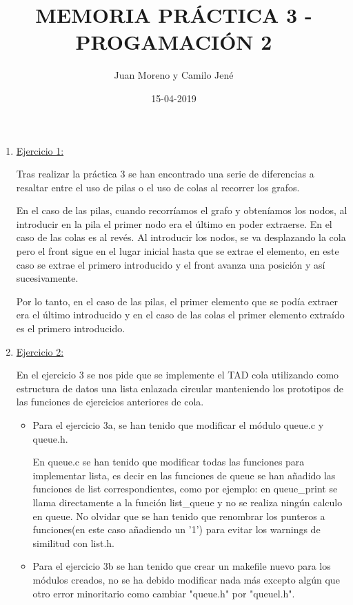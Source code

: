 \documentclass[spanish]{article}
\title{MEMORIA PRÁCTICA 3 - PROGAMACIÓN 2}
\author{Juan Moreno y Camilo Jené}
\date{15-04-2019}
\begin{document}
	\maketitle
	
	\begin{enumerate}
		\item \begin{large}\underline{Ejercicio 1:}\end{large}
		
	    \quad Tras realizar la práctica 3 se han encontrado una serie de diferencias a resaltar entre el uso de pilas o el uso de colas al recorrer los grafos.
		
		\quad En el caso de las pilas, cuando recorríamos el grafo y obteníamos los nodos, al introducir en la pila el primer nodo era el último en poder extraerse. En el caso de las colas es al revés. Al introducir los nodos, se va desplazando la cola pero el front sigue en el lugar inicial hasta que se extrae el elemento, en este caso se extrae el primero introducido y el front avanza una posición y así sucesivamente.
		
		\quad Por lo tanto, en el caso de las pilas, el primer elemento que se podía extraer era el último introducido y en el caso de las colas el primer elemento extraído es el primero introducido.
		\newline
		\item \begin{large}\underline{Ejercicio 2:}\end{large}

		\quad En el ejercicio 3 se nos pide que se implemente el TAD cola utilizando como estructura de datos una lista enlazada circular manteniendo los prototipos de las funciones de ejercicios anteriores de cola.
			\begin{itemize}
				\item Para el ejercicio 3a, se han tenido que modificar el módulo queue.c y queue.h.
				
				En queue.c se han tenido que modificar todas las funciones para implementar lista, es decir en las funciones de queue se han añadido las funciones de list correspondientes, como por ejemplo: en queue\_print se llama directamente a la función list\_queue y no se realiza ningún calculo en queue. No olvidar que se han tenido que renombrar los punteros a funciones(en este caso añadiendo un '1') para evitar los warnings de similitud con list.h.
				\item Para el ejercicio 3b se han tenido que crear un makefile nuevo para los módulos creados, no se ha debido modificar nada más excepto algún que otro error minoritario como cambiar "queue.h" por "queuel.h". 
			\end{itemize} 
		
	\end{enumerate}
\end{document}
